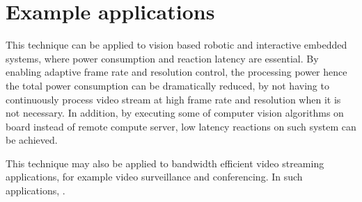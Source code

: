 \section{Example applications} %

\iffalse
Example applications, can be multiple.
e.g. Video conference.
\fi

This technique can be applied to vision based robotic and interactive embedded systems, where power consumption and reaction latency are essential. By enabling adaptive frame rate and resolution control, the processing power hence the total power consumption can be dramatically reduced, by not having to continuously process video stream at high frame rate and resolution when it is not necessary. In addition, by executing some of computer vision algorithms on board instead of remote compute server, low latency reactions on such system can be achieved.

This technique may also be applied to bandwidth efficient video streaming applications, for example video surveillance and conferencing. In such applications, .
